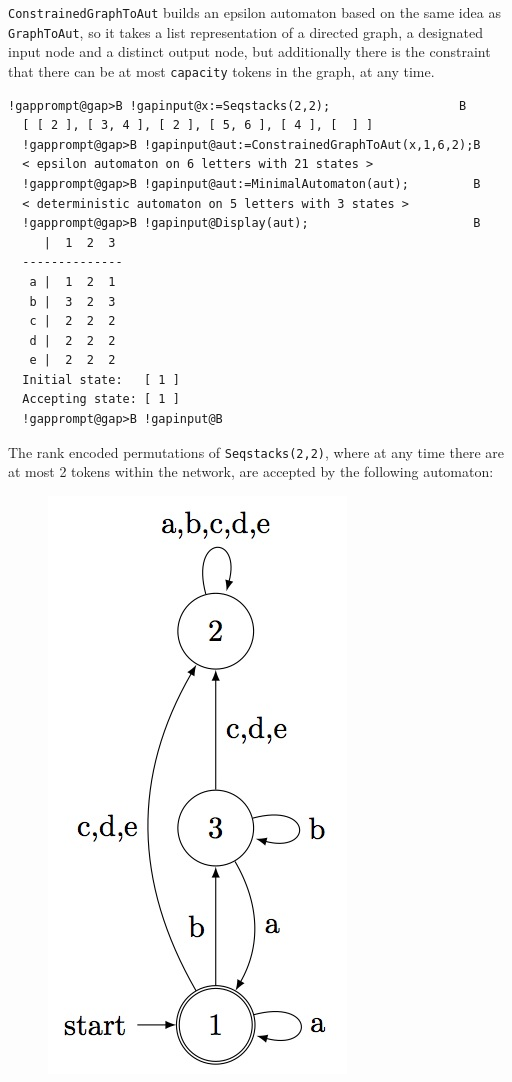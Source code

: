 \documentclass[a4paper,11pt]{report}
\begin{document}
{{{ \texttt{ConstrainedGraphToAut} builds an epsilon automaton based on the same idea as \texttt{GraphToAut}, so it takes a list representation of a directed graph, a designated input
node and a distinct output node, but additionally there is the constraint that
there can be at most \texttt{capacity} tokens in the graph, at any time. 
\begin{Verbatim}[commandchars=!@B,fontsize=\small,frame=single,label=Example]
  !gapprompt@gap>B !gapinput@x:=Seqstacks(2,2);                  B
  [ [ 2 ], [ 3, 4 ], [ 2 ], [ 5, 6 ], [ 4 ], [  ] ]
  !gapprompt@gap>B !gapinput@aut:=ConstrainedGraphToAut(x,1,6,2);B
  < epsilon automaton on 6 letters with 21 states >
  !gapprompt@gap>B !gapinput@aut:=MinimalAutomaton(aut);         B
  < deterministic automaton on 5 letters with 3 states >
  !gapprompt@gap>B !gapinput@Display(aut);                       B
     |  1  2  3  
  --------------
   a |  1  2  1  
   b |  3  2  3  
   c |  2  2  2  
   d |  2  2  2  
   e |  2  2  2  
  Initial state:   [ 1 ]
  Accepting state: [ 1 ]
  !gapprompt@gap>B !gapinput@B
\end{Verbatim}
  The rank encoded permutations of \texttt{Seqstacks(2,2)}, where at any time there are at most 2 tokens within the network, are
accepted by the following automaton: \begin{figure}[H] \begin{center}
\leavevmode \includegraphics[scale=0.75]{img/ss22c2aut.jpg} \end{center}

\end{figure}}}}
\end{document}
